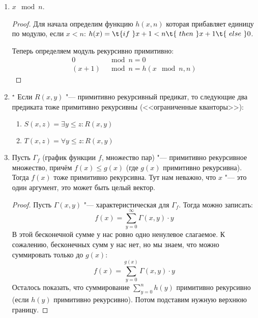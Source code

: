 \begin{enumerate}
\begin{alignat*}{2}
			f(x) &= \t{if~} r(x)&\t{~then~}&g(x) \\
			     &              &\t{~else~}&h(x)
		\end{alignat*}
		где $r(x)$ "--- примитивно рекурсивный предикат, а $g(x)$ и $h(x)$ "--- примитивно рекурсивные функции.
		\begin{proof}
			\[ f(x) = (1 \dot- r(x))h(x) + r(x)g(x) \]
			Если $r(x)=0$ (неверен), то зануляется первое слагаемое, а второе остаётся.
			Если $r(x)=1$, то наоборот.
		\end{proof}
	\item $x \mod n$.
		\begin{proof}
			Для начала определим функцию $h(x, n)$ которая прибавляет единицу по модулю,
			если $x<n$: $h(x) = \t{if~} x+1 < n \t{~then~} x + 1 \t{~else~} 0$.

			Теперь определяем модуль рекурсивно примитивно:
			\begin{align*}
			0     &\mod n = 0 \\
			(x+1) &\mod n = h(x \mod n, n)
			\end{align*}
		\end{proof}
	\item$^\star$\label{limitedQuantification}
		Если $R(x, y)$ "--- примитивно рекурсивный предикат, то следующие два предиката тоже примитивно рекурсивны (<<ограниченные кванторы>>):
		\begin{enumerate}
			\item $S(x, z) = \exists y \le z \colon R(x, y)$
			\item $T(x, z) = \forall y \le z \colon R(x, y)$
		\end{enumerate}
	\item
		Пусть $\Gamma_f$ (график функции $f$, множество пар) "--- примитивно рекурсивное множество,
		причём $f(x) \le g(x)$ (где $g(x)$ примитивно рекурсивна).
		Тогда $f(x)$ тоже примитивно рекурсивна.
		Тут нам неважно, что $x$ "--- это один аргумент, это может быть целый вектор.
		\begin{proof}
			Пусть $\Gamma(x, y)$ "--- характеристическая для $\Gamma_f$.
			Тогда можно записать:
			\[
				f(x) = \sum_{y=0}^\infty \Gamma(x, y) \cdot y
			\]
			В этой бесконечной сумме у нас ровно одно ненулевое слагаемое.
			К сожалению, бесконечных сумм у нас нет, но мы знаем, что можно суммировать только до $g(x)$:
			\[
				f(x) = \sum_{y=0}^{g(x)} \Gamma(x, y) \cdot y
			\]
			Осталось показать, что суммирование $\sum_{y=0}^n h(y)$ примитивно рекурсивно (если $h(y)$ примитивно рекурсивно).
			Потом подставим нужную верхнюю границу.


\end{proof}
\end{enumerate}
